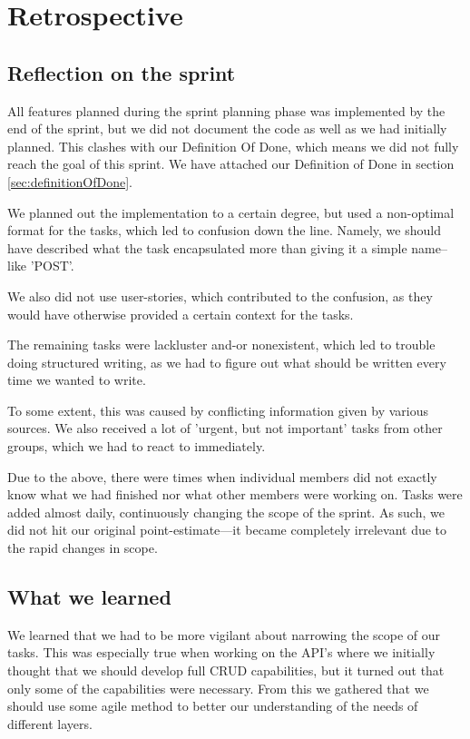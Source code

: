 \section{Retrospective}

\subsection{Reflection on the sprint}
All features planned during the sprint planning phase was implemented by the end of the sprint, but we did not document the code as well as we had initially planned. 
This clashes with our Definition Of Done, which means we did not fully reach the goal of this sprint. We have attached our Definition of Done in section \ref{sec:definitionOfDone}.

We planned out the implementation to a certain degree, but used a non-optimal format for the tasks, which led to confusion down the line. Namely, we should have described what the task encapsulated more than giving it a simple name--like 'POST'. 

We also did not use user-stories, which contributed to the confusion, as they would have otherwise provided a certain context for the tasks.

The remaining tasks were lackluster and-or nonexistent, which led to trouble doing structured writing, as we had to figure out what should be written every time we wanted to write.
    
To some extent, this was caused by conflicting information given by various sources. We also received a lot of 'urgent, but not important' tasks from other groups, which we had to react to immediately.
    
Due to the above, there were times when individual members did not exactly know what we had finished nor what other members were working on. Tasks were added almost daily, continuously changing the scope of the sprint.
As such, we did not hit our original point-estimate---it became completely irrelevant due to the rapid changes in scope.

\subsection{What we learned}\label{Whatwelearnedsprint3}
We learned that we had to be more vigilant about narrowing the scope of our tasks. 
This was especially true when working on the API's where we initially thought that we should develop full CRUD capabilities, but it turned out that only some of the capabilities were necessary. 
From this we gathered that we should use some agile method to better our understanding of the needs of different layers.

